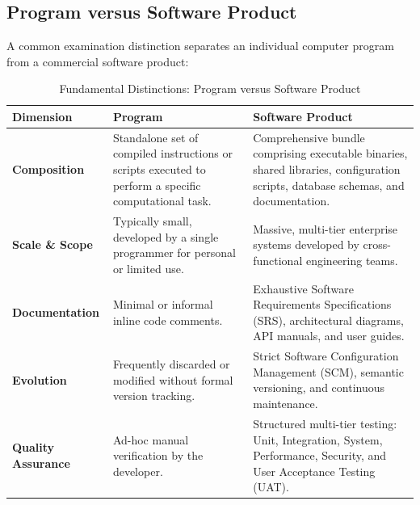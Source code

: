 \subsection{Program versus Software Product}
A common examination distinction separates an individual computer program from a commercial software product:
\begin{table}[htbp]
\centering
\small
\caption{Fundamental Distinctions: Program versus Software Product}
\label{tab:program_vs_software}
\begin{tabularx}{\textwidth}{l p{4.5cm} X}
\toprule
\textbf{Dimension} & \textbf{Program} & \textbf{Software Product} \\
\midrule
\textbf{Composition} & Standalone set of compiled instructions or scripts executed to perform a specific computational task. & Comprehensive bundle comprising executable binaries, shared libraries, configuration scripts, database schemas, and documentation. \\
\textbf{Scale \& Scope} & Typically small, developed by a single programmer for personal or limited use. & Massive, multi-tier enterprise systems developed by cross-functional engineering teams. \\
\textbf{Documentation} & Minimal or informal inline code comments. & Exhaustive Software Requirements Specifications (SRS), architectural diagrams, API manuals, and user guides. \\
\textbf{Evolution} & Frequently discarded or modified without formal version tracking. & Strict Software Configuration Management (SCM), semantic versioning, and continuous maintenance. \\
\textbf{Quality Assurance} & Ad-hoc manual verification by the developer. & Structured multi-tier testing: Unit, Integration, System, Performance, Security, and User Acceptance Testing (UAT). \\
\bottomrule
\end{tabularx}
\end{table}

